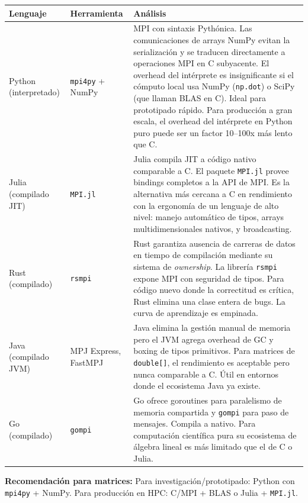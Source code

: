 \documentclass[12pt,a4paper]{article}
\begin{document}
\begin{longtable}{L{2.5cm} L{3.5cm} L{7.5cm}}
\toprule
\textbf{Lenguaje} & \textbf{Herramienta} & \textbf{Análisis} \\
\midrule
\endhead
Python (interpretado) & \texttt{mpi4py} + NumPy & MPI con sintaxis Pythónica. Las comunicaciones de
  arrays NumPy evitan la serialización y se traducen directamente a operaciones
  MPI en C subyacente. El overhead del intérprete es insignificante si el
  cómputo local usa NumPy (\texttt{np.dot}) o SciPy (que llaman BLAS en C).
  Ideal para prototipado rápido. Para producción a gran escala, el overhead del
  intérprete en Python puro puede ser un factor 10--100x más lento que C. \\[4pt]
Julia (compilado JIT) & \texttt{MPI.jl} & Julia compila JIT a código nativo
  comparable a C. El paquete \texttt{MPI.jl} provee bindings completos a la
  API de MPI. Es la alternativa más cercana a C en rendimiento con la
  ergonomía de un lenguaje de alto nivel: manejo automático de tipos, arrays
  multidimensionales nativos, y broadcasting. \\[4pt]
Rust (compilado) & \texttt{rsmpi} & Rust garantiza ausencia de carreras de
  datos en tiempo de compilación mediante su sistema de \textit{ownership}.
  La librería \texttt{rsmpi} expone MPI con seguridad de tipos. Para código
  nuevo donde la correctitud es crítica, Rust elimina una clase entera de bugs.
  La curva de aprendizaje es empinada. \\[4pt]
Java (compilado JVM) & MPJ Express, FastMPJ & Java elimina la gestión manual de
  memoria pero el JVM agrega overhead de GC y boxing de tipos primitivos. Para
  matrices de \texttt{double[]}, el rendimiento es aceptable pero nunca comparable
  a C. Útil en entornos donde el ecosistema Java ya existe. \\[4pt]
Go (compilado) & \texttt{gompi} & Go ofrece goroutines para paralelismo de
  memoria compartida y \texttt{gompi} para paso de mensajes. Compila a nativo.
  Para computación científica pura su ecosistema de álgebra lineal es más
  limitado que el de C o Julia. \\
\bottomrule
\end{longtable}

\textbf{Recomendación para matrices:} Para investigación/prototipado: Python con
\texttt{mpi4py} + NumPy. Para producción en HPC: C/MPI + BLAS o Julia + \texttt{MPI.jl}.

\newpage

\end{document}
